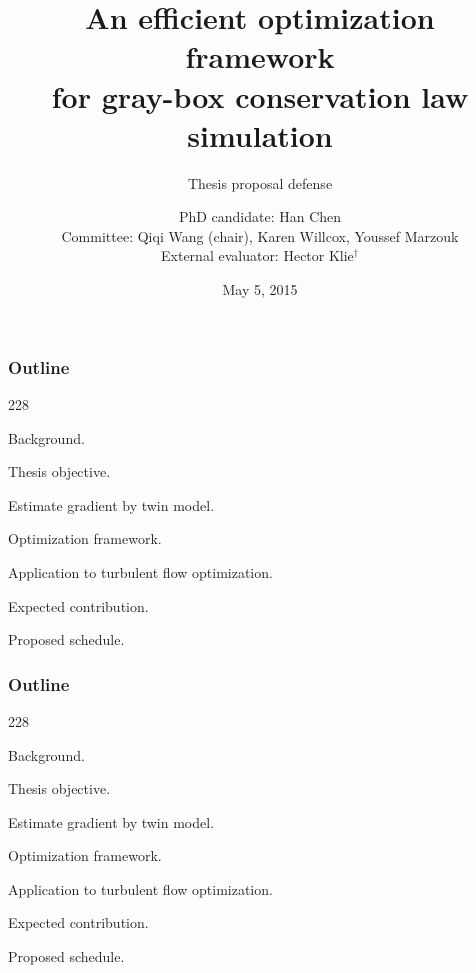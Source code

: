 \documentclass{beamer}
\title{An efficient optimization framework\\ for gray-box conservation law simulation}
\subtitle{Thesis proposal defense}
\author{\scriptsize
   PhD candidate: Han Chen\\\vspace{0.5cm} Committee: Qiqi Wang (chair), Karen Willcox, Youssef Marzouk\\
   External evaluator: Hector Klie$^\dagger$}
\institute{Massachusetts Institute of Technology\\ $^\dagger$ ConocoPhillips Inc.}
\date{\scriptsize May 5, 2015}
\newcommand{\barrow}{\item[\color{darkred}\ding{228}]}
\begin{document}
\begin{frame}
    \titlepage
\end{frame}

\setcounter{framenumber}{0}
\begin{frame}
    \frametitle{Outline}\small
    \begin{dinglist}{228}
        \barrow {}Background.
        \barrow Thesis objective.
        \vspace{.35cm}
        \barrow Estimate gradient by twin model.
        \barrow Optimization framework.
        \barrow Application to turbulent flow optimization.
        \vspace{.35cm}
        \barrow Expected contribution.
        \barrow Proposed schedule.
    \end{dinglist}
\end{frame}

\setcounter{framenumber}{0}
\begin{frame}
    \frametitle{Outline}\small
    \begin{dinglist}{228}
        \barrow Background.
        \barrow Thesis objective.
        \vspace{.35cm}
        \barrow Estimate gradient by twin model.
        \barrow Optimization framework.
        \barrow Application to turbulent flow optimization.
        \vspace{.35cm}
        \barrow Expected contribution.
        \barrow Proposed schedule.
    \end{dinglist}
\end{frame}
\end{document}
